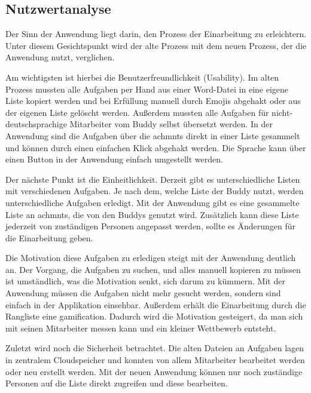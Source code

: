\documentclass[11pt]{article}
\begin{document}
\subsection{Nutzwertanalyse}

Der Sinn der Anwendung liegt darin, den Prozess der Einarbeitung zu erleichtern. Unter diesem Gesichtspunkt wird der alte Prozess
mit dem neuen Prozess, der die Anwendung nutzt, verglichen.

Am wichtigsten ist hierbei die Benutzerfreundlichkeit (Usability). Im alten Prozess mussten alle Aufgaben per Hand aus einer Word-Datei in eine eigene
Liste kopiert werden und bei Erfüllung manuell durch Emojis abgehakt oder aus der eigenen Liste gelöscht werden. 
Außerdem mussten alle Aufgaben für nicht-deutschsprachige Mitarbeiter vom Buddy selbst übersetzt werden.\newline
In der Anwendung sind die Aufgaben über die \glspl{achmnt} direkt in einer Liste gesammelt und können durch einen einfachen Klick abgehakt werden.
Die Sprache kann über einen Button in der Anwendung einfach umgestellt werden.

Der nächste Punkt ist die Einheitlichkeit. Derzeit gibt es unterschiedliche Listen mit verschiedenen Aufgaben. Je nach dem, welche Liste der
Buddy nutzt, werden unterschiedliche Aufgaben erledigt. \newline
Mit der Anwendung gibt es eine gesammelte Liste an \glspl{achmnt}, die von den Buddys genutzt wird. Zusätzlich kann diese Liste jederzeit von 
zuständigen Personen angepasst werden, sollte es Änderungen für die Einarbeitung geben.

Die Motivation diese Aufgaben zu erledigen steigt mit der Anwendung deutlich an. Der Vorgang, die Aufgaben zu suchen, und alles manuell kopieren
zu müssen ist umständlich, was die Motivation senkt, sich darum zu kümmern. Mit der Anwendung müssen die Aufgaben nicht mehr gesucht werden, sondern
sind einfach in der Applikation einsehbar. Außerdem erhält die Einarbeitung durch die Rangliste eine \Gls{gamification}. Dadurch wird die Motivation gesteigert, 
da man sich mit seinen Mitarbeiter messen kann und ein kleiner Wettbewerb entsteht.

Zuletzt wird noch die Sicherheit betrachtet. Die alten Dateien an Aufgaben lagen in zentralem Cloudspeicher und konnten von allem Mitarbeiter bearbeitet werden 
oder neu erstellt werden. Mit der neuen Anwendung können nur noch zuständige Personen auf die Liste direkt zugreifen und diese bearbeiten.  
\end{document}
